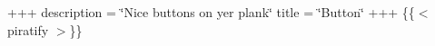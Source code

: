 +++ description = \char`\"{}\+Nice buttons on yer plank\char`\"{} title = \char`\"{}\+Button\char`\"{} +++ \{\{$<$ piratify $>$\}\} 